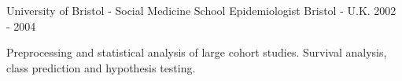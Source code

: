 \begin{cventries}

\cventry
{University of Bristol - Social Medicine School} %
{Epidemiologist} %
{Bristol - U.K.} %
{2002 - 2004} %
{ %
\begin{cvitems}
\item {Preprocessing and statistical analysis of large cohort studies. Survival analysis, class prediction and hypothesis testing.} %
\end{cvitems}        
}


\end{cventries}
